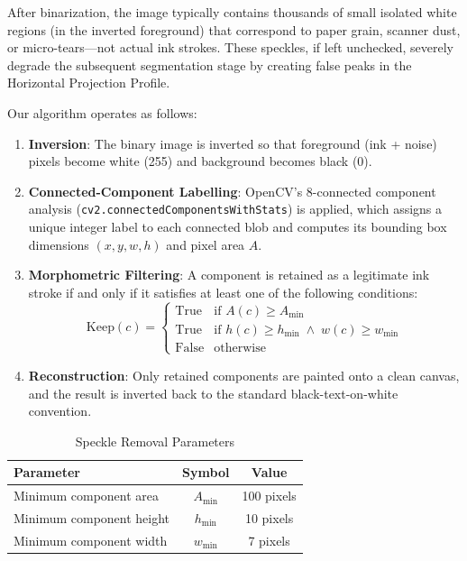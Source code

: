 \documentclass[12pt, a4paper]{article}
\begin{document}
After binarization, the image typically contains thousands of small isolated white regions (in the inverted foreground) that correspond to paper grain, scanner dust, or micro-tears---not actual ink strokes. These speckles, if left unchecked, severely degrade the subsequent segmentation stage by creating false peaks in the Horizontal Projection Profile.

Our algorithm operates as follows:

\begin{enumerate}
    \item \textbf{Inversion}: The binary image is inverted so that foreground (ink + noise) pixels become white (255) and background becomes black (0).
    \item \textbf{Connected-Component Labelling}: OpenCV's 8-connected component analysis (\texttt{cv2.connectedComponentsWithStats}) is applied, which assigns a unique integer label to each connected blob and computes its bounding box dimensions $(x, y, w, h)$ and pixel area $A$.
    \item \textbf{Morphometric Filtering}: A component is retained as a legitimate ink stroke if and only if it satisfies at least one of the following conditions:
    \begin{equation}
        \text{Keep}(c) = \begin{cases}
            \text{True} & \text{if } A(c) \geq A_{\min} \\
            \text{True} & \text{if } h(c) \geq h_{\min} \;\wedge\; w(c) \geq w_{\min} \\
            \text{False} & \text{otherwise}
        \end{cases}
        \label{eq:speckle}
    \end{equation}
    \item \textbf{Reconstruction}: Only retained components are painted onto a clean canvas, and the result is inverted back to the standard black-text-on-white convention.
\end{enumerate}

\begin{table}[H]
\centering
\caption{Speckle Removal Parameters}
\label{tab:speckle_params}
\begin{tabular}{@{}lcc@{}}
\toprule
\textbf{Parameter} & \textbf{Symbol} & \textbf{Value} \\
\midrule
Minimum component area & $A_{\min}$ & 100 pixels \\
Minimum component height & $h_{\min}$ & 10 pixels \\
Minimum component width & $w_{\min}$ & 7 pixels \\
\bottomrule
\end{tabular}
\end{table}
\end{document}
